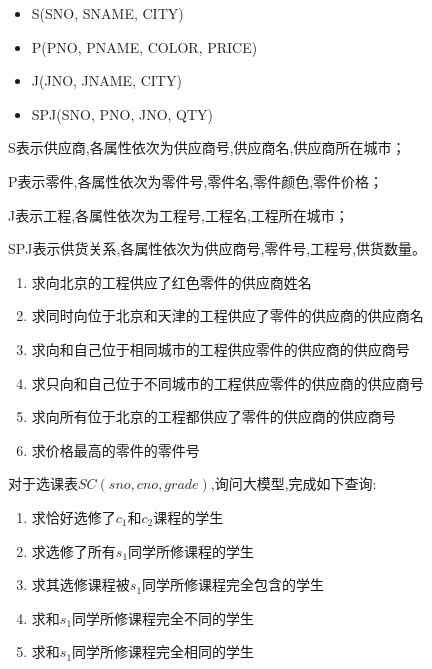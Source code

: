 \begin{problemset}
    \item 
    \begin{itemize}
    \item S(SNO, SNAME, CITY)
    \item P(PNO, PNAME, COLOR, PRICE)
    \item J(JNO, JNAME, CITY)
    \item SPJ(SNO, PNO, JNO, QTY)
    \end{itemize}
    S表示供应商,各属性依次为供应商号,供应商名,供应商所在城市；

    P表示零件,各属性依次为零件号,零件名,零件颜色,零件价格；

    J表示工程,各属性依次为工程号,工程名,工程所在城市；

    SPJ表示供货关系,各属性依次为供应商号,零件号,工程号,供货数量。
    \begin{enumerate}
  \item 求向北京的工程供应了红色零件的供应商姓名
  
  \item
  求同时向位于北京和天津的工程供应了零件的供应商的供应商名
  
  \item
  求向和自己位于相同城市的工程供应零件的供应商的供应商号
  
  \item
  求只向和自己位于不同城市的工程供应零件的供应商的供应商号
  
  \item
  求向所有位于北京的工程都供应了零件的供应商的供应商号
  
  \item 求价格最高的零件的零件号
\end{enumerate}
    \item 对于选课表$SC(sno, cno, grade)$,询问大模型,完成如下查询:
\begin{enumerate}
  \item 求恰好选修了$c_1$和$c_2$课程的学生
  
  \item 求选修了所有$s_1$同学所修课程的学生
  
  \item 求其选修课程被$s_1$同学所修课程完全包含的学生
  
  \item 求和$s_1$同学所修课程完全不同的学生
  
  \item 求和$s_1$同学所修课程完全相同的学生
  

\end{enumerate}
\end{problemset}
